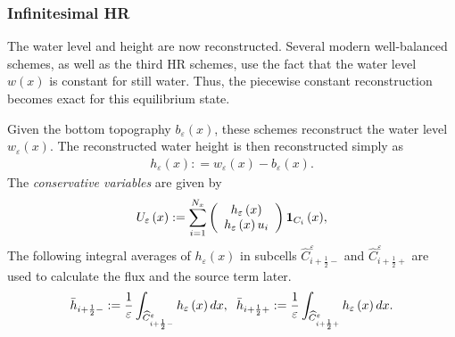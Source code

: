 \documentclass[11pt,a4paper,center,notitlepage]{article}
\numberwithin{equation}{section}
\begin{document}
\subsubsection{Infinitesimal HR}
The water level and height are now reconstructed. Several modern well-balanced schemes, as well as the third HR schemes, use the fact that the water level $w\left(x\right)$ is constant for still water. Thus, the piecewise constant reconstruction becomes exact for this equilibrium state. 

Given the bottom topography $b_\varepsilon \left(x\right)$, these schemes reconstruct the water level $w_\varepsilon \left(x\right)$. The reconstructed water height is then reconstructed simply as 
\begin{align}
{h_\varepsilon }\left( x \right): = {w_\varepsilon }\left( x \right) - {b_\varepsilon }\left( x \right).
\end{align}
The \textit{conservative variables} are given by
\begin{align}
{U_\varepsilon }\left( x \right): = \sum\limits_{i = 1}^{{N_x}} {\left( {\begin{array}{*{20}{c}}
{{h_\varepsilon }\left( x \right)}\\
{{h_\varepsilon }\left( x \right){u_i}}
\end{array}} \right){{\bf 1}_{{C_i}}}\left( x \right)} ,
\end{align}
The following integral averages of $h_\varepsilon \left(x\right)$ in subcells $\widehat C_{i + \frac{1}{2} - }^\varepsilon$ and $\widehat C_{i + \frac{1}{2} + }^\varepsilon $ are used to calculate the flux and the source term later. 
\begin{align}
\label{3.36}
{{\bar h}_{i + \frac{1}{2} - }}: = \frac{1}{\varepsilon }\int_{\widehat C_{i + \frac{1}{2} - }^\varepsilon } {{h_\varepsilon }\left( x \right)dx} , \hspace{2mm} {{\bar h}_{i + \frac{1}{2} + }}: = \frac{1}{\varepsilon }\int_{\widehat C_{i + \frac{1}{2} + }^\varepsilon } {{h_\varepsilon }\left( x \right)dx} .
\end{align}
\end{document}
